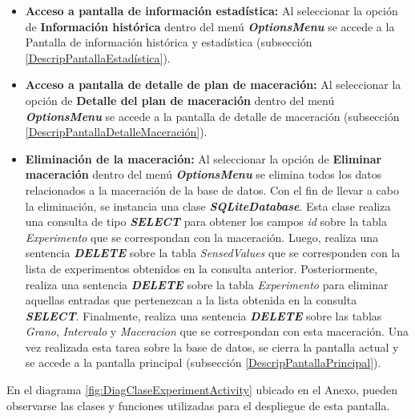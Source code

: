 \begin{itemize}
                    \item \textbf{Acceso a pantalla de información estadística:} Al seleccionar la opción de \textbf{Información histórica} dentro del menú \textbf{\textit{\gls{OptionsMenu}}} se accede a la Pantalla de información histórica y estadística (subsección \ref{DescripPantallaEstadística}).
                    
                    \item \textbf{Acceso a pantalla de detalle de plan de maceración:} Al seleccionar la opción de \textbf{Detalle del plan de maceración} dentro del menú \textbf{\textit{\gls{OptionsMenu}}} se accede a la pantalla de detalle de maceración (subsección \ref{DescripPantallaDetalleMaceración}).
                    
                    \item \textbf{Eliminación de la maceración:} Al seleccionar la opción de \textbf{Eliminar maceración} dentro del menú \textbf{\textit{\gls{OptionsMenu}}} se elimina todos los datos relacionados a la maceración de la base de datos. Con el fin de llevar a cabo la eliminación, se instancia una clase \textbf{\textit{\gls{SQLiteDatabase}}}. 
                    Esta clase realiza una consulta de tipo \textbf{\textit{\gls{SELECT}}} para obtener los campos \textit{id} sobre la tabla \textit{Experimento} que se correspondan con la maceración. Luego, realiza una sentencia \textbf{\textit{\gls{DELETE}}} sobre la tabla \textit{SensedValues} que se corresponden con la lista de experimentos obtenidos en la consulta anterior. Posteriormente, realiza una sentencia \textbf{\textit{\gls{DELETE}}} sobre la tabla \textit{Experimento} para eliminar aquellas entradas que pertenezcan a la lista obtenida en la consulta \textbf{\textit{\gls{SELECT}}}. Finalmente, realiza una sentencia \textbf{\textit{\gls{DELETE}}} sobre las tablas \textit{Grano}, \textit{Intervalo} y \textit{Maceracion} que se correspondan con esta maceración.
                    Una vez realizada esta tarea sobre la base de datos, se cierra la pantalla actual y se accede a la pantalla principal (subsección \ref{DescripPantallaPrincipal}).
                   
                \end{itemize}
                
                
                \par En el diagrama \ref{fig:DiagClaseExperimentActivity} ubicado en el Anexo, pueden observarse las clases y funciones utilizadas para el despliegue de esta pantalla.
            
